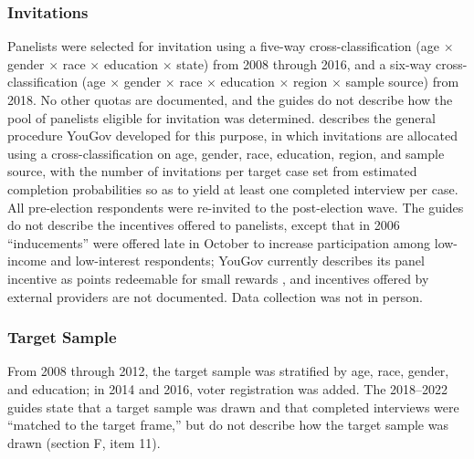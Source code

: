 \documentclass[12pt]{article}
\begin{document}
\subsubsection*{Invitations}
Panelists were selected for invitation using a five-way cross-classification (age $\times$ gender $\times$ race $\times$ education $\times$ state) from 2008 through 2016, and a six-way cross-classification (age $\times$ gender $\times$ race $\times$ education $\times$ region $\times$ sample source) from 2018. No other quotas are documented, and the guides do not describe how the pool of panelists eligible for invitation was determined. \textcite{rivers_sample_2006} describes the general procedure YouGov developed for this purpose, in which invitations are allocated using a cross-classification on age, gender, race, education, region, and sample source, with the number of invitations per target case set from estimated completion probabilities so as to yield at least one completed interview per case. All pre-election respondents were re-invited to the post-election wave. The guides do not describe the incentives offered to panelists, except that in 2006 ``inducements'' were offered late in October to increase participation among low-income and low-interest respondents; YouGov currently describes its panel incentive as points redeemable for small rewards \parencite{yougov_methodology}, and incentives offered by external providers are not documented. Data collection was not in person.

\subsubsection*{Target Sample}
From 2008 through 2012, the target sample was stratified by age, race, gender, and education; in 2014 and 2016, voter registration was added. The 2018--2022 guides state that a target sample was drawn and that completed interviews were ``matched to the target frame,'' but do not describe how the target sample was drawn (section F, item 11).
\end{document}
